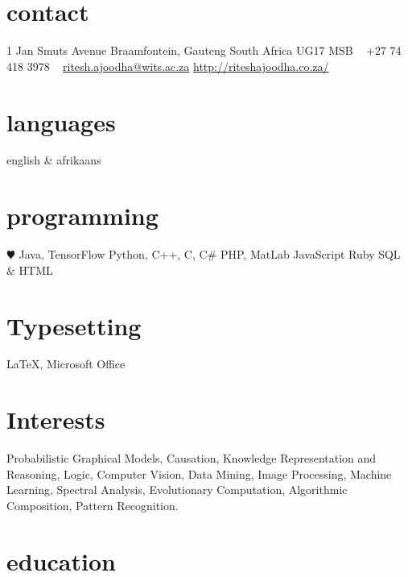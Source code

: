 \documentclass[]{friggeri-cv} %
\begin{document}


\begin{aside} %
\section{contact}
1 Jan Smuts Avenue
Braamfontein, Gauteng
South Africa
UG17 MSB
~
+27 74 418 3978
~
\href{mailto:ritesh.ajoodha@wits.ac.za}{ritesh.ajoodha@wits.ac.za}
\href{http://riteshajoodha.co.za/}{http://riteshajoodha.co.za/}

\section{languages}
english \& afrikaans
\section{programming}
{\color{red} $\varheartsuit$} Java, TensorFlow
Python, C++, C, C\#
PHP, MatLab
JavaScript
Ruby
SQL \& HTML
\section{Typesetting}
\LaTeX, Microsoft Office

\section{Interests}
Probabilistic Graphical Models, Causation, Knowledge Representation and Reasoning, Logic, Computer Vision, Data Mining, Image Processing, Machine Learning, Spectral Analysis, Evolutionary Computation, Algorithmic Composition, Pattern Recognition. 
\end{aside}

\section{education}
\end{document}
